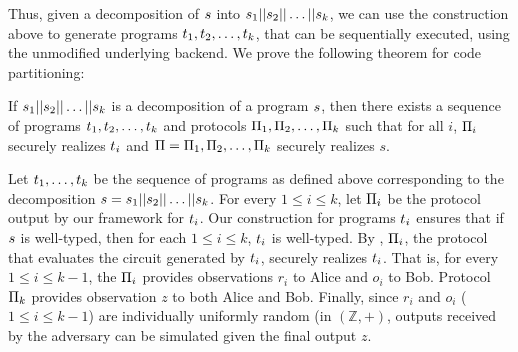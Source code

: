 Thus, given a decomposition of $s$ into
$s_1||s_2||\dots||s_k$, we can use the construction
above to generate programs $t_1,t_2,\ldots,t_k$, that
can be sequentially executed, using the unmodified underlying \mpc
backend. We prove the following theorem for code partitioning:


\begin{theorem}
If $s_1||s_2||\ldots||s_k$ is a decomposition of a program $s$, then there exists a sequence of programs $t_1, t_2, \ldots, t_k$ and protocols $\Pi_1, \Pi_2, \ldots, \Pi_k$ such that for all $i$, $\Pi_i$ securely realizes $t_i$ and  $\Pi
= \Pi_1,\Pi_2,\dots,\Pi_k$ securely realizes $s$.
\end{theorem}

 Let $t_1, \ldots, t_k$ be the
sequence of programs as defined above corresponding to the
decomposition $s = s_1||s_2||\ldots||s_k$.  For every
$1\leq i\leq k$, let $\Pi_i$ be the \mpc protocol output by our
framework for $t_i$. Our construction for programs $t_i$
ensures that if $s$ is well-typed, then for each $1\leq i \leq k$,
$t_i$ is well-typed. By , $\Pi_i$,
the \mpc protocol that evaluates the circuit generated by $t_i$,
securely realizes $t_i$. That is, for every $1\leq i \leq k-1$,
the $\Pi_i$ provides observations $r_i$ to Alice and $o_i$
to Bob. Protocol $\Pi_k$ provides observation $z$ to both Alice
and Bob. Finally, since $r_i$ and $o_i$ ($1\leq i\leq k-1$) are
individually uniformly random (in $(\mathbb{Z},+)$, outputs received
by the adversary can be simulated given the final output $z$.


%

